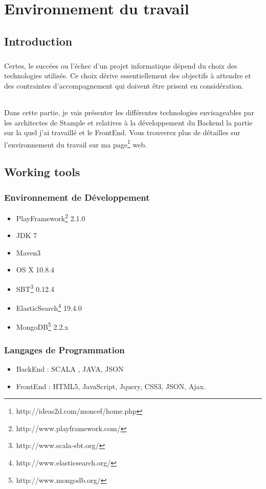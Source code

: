 \chapter{Environnement du travail}
\section{Introduction}
\paragraph{}
Certes, le succées ou l'échec d'un projet informatique dépend du choix des technologies utilisés.
Ce choix dérive essentiellement des objectifs à attendre et des contraintes d'accompagnement qui doivent être prisent en considération.
\subparagraph{}
Dans cette partie, je vais présenter les différentes technologies envisageables par les architectes de Stample 
et relatives à la développement du Backend la partie sur la quel j'ai travaillé et le FrontEnd.
Vous trouverez plus de détailles sur l'environnement du travail sur ma page\footnote{http://ideas2d.com/moncef/home.php} web.
\section{Working tools}
\subsection{Environnement de Développement}
\begin{itemize}
\item PlayFramework\footnote{http://www.playframework.com/} 2.1.0
\item JDK 7
\item Maven3
\item OS X 10.8.4
\item SBT\footnote{http://www.scala-sbt.org/} 0.12.4
\item ElasticSearch\footnote{http://www.elasticsearch.org/} 19.4.0
\item MongoDB\footnote{http://www.mongodb.org/} 2.2.x
\end{itemize}
\subsection{Langages de Programmation}
\begin{itemize}
\item BackEnd : SCALA , JAVA, JSON
\item FrontEnd : HTML5, JavaScript, Jquery, CSS3, JSON, Ajax. 
\end{itemize}
